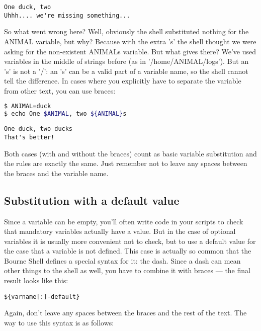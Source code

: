 \scriptsize
\begin{verbatim}
One duck, two
Uhhh.... we're missing something...
\end{verbatim}
\normalsize

So what went wrong here? Well, obviously the shell substituted nothing for the
ANIMAL variable, but why? Because with the extra 's' the shell thought we were
asking for the non-existent ANIMALs variable. But what gives there? We've used
variables in the middle of strings before (as in '/home/ANIMAL/logs'). But an
's' is not a '/': an 's' can be a valid part of a variable name, so the shell
cannot tell the difference. In cases where you explicitly have to separate the
variable from other text, you can use braces:
\lstset{basicstyle=\scriptsize, numbers=left, captionpos=b, tabsize=4}
\begin{lstlisting}[caption=Adding some text to a variable's value take II,language={bash},
breaklines=true,xleftmargin=15pt,label=lst:AddingsometexttoavariablesvaluetakeII]
$ ANIMAL=duck
$ echo One $ANIMAL, two ${ANIMAL}s
\end{lstlisting}

\scriptsize
\begin{verbatim}
One duck, two ducks
That's better!
\end{verbatim}
\normalsize

Both cases (with and without the braces) count as basic variable substitution
and the rules are exactly the same. Just remember not to leave any spaces
between the braces and the variable name.

\subsection{Substitution with a default value}
Since a variable can be empty, you'll often write code in your scripts to check
that mandatory variables actually have a value. But in the case of optional
variables it is usually more convenient not to check, but to use a default
value for the case that a variable is not defined. This case is actually so
common that the Bourne Shell defines a special syntax for it: the dash. Since a
dash can mean other things to the shell as well, you have to combine it with
braces --- the final result looks like this:
\scriptsize
\begin{verbatim}
${varname[:]-default}
\end{verbatim}
\normalsize

Again, don't leave any spaces between the braces and the rest of the text. The
way to use this syntax is as follows:

